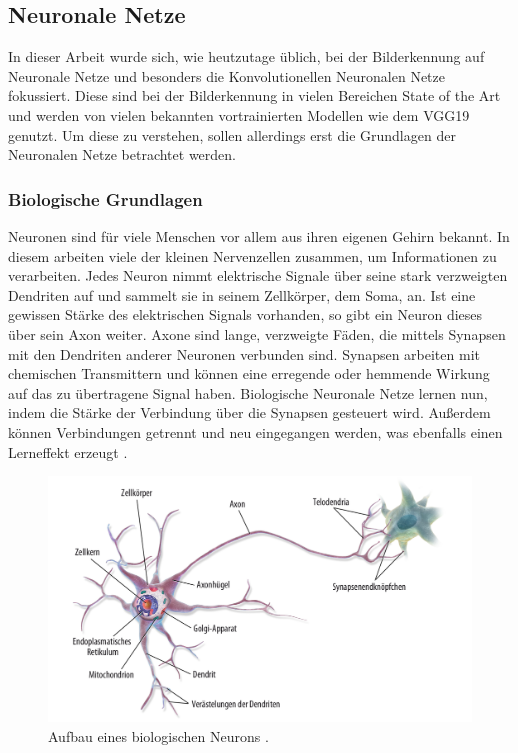 \documentclass[11pt,bibliography=totocnumbered]{scrartcl}
\begin{document}
\vspace*{-5mm}
\subsection{Neuronale Netze}
In dieser Arbeit wurde sich, wie heutzutage üblich, bei der Bilderkennung auf Neuronale Netze und besonders die Konvolutionellen Neuronalen Netze fokussiert. Diese sind bei der Bilderkennung in vielen Bereichen State of the Art und werden von vielen bekannten vortrainierten Modellen wie dem VGG19 genutzt. Um diese zu verstehen, sollen allerdings erst die Grundlagen der Neuronalen Netze betrachtet werden.
\subsubsection{Biologische Grundlagen}
Neuronen sind für viele Menschen vor allem aus ihren eigenen Gehirn bekannt. In diesem arbeiten viele der kleinen Nervenzellen zusammen, um Informationen zu verarbeiten. Jedes Neuron nimmt elektrische Signale über seine stark verzweigten Dendriten auf und sammelt sie in seinem Zellkörper, dem Soma, an. Ist eine gewissen Stärke des elektrischen Signals vorhanden, so gibt ein Neuron dieses über sein Axon weiter. Axone sind lange, verzweigte Fäden, die mittels Synapsen mit den Dendriten anderer Neuronen verbunden sind. Synapsen arbeiten mit chemischen Transmittern und können eine erregende oder hemmende Wirkung auf das zu übertragene Signal haben. Biologische Neuronale Netze lernen nun, indem die Stärke der Verbindung über die Synapsen gesteuert wird. Außerdem können Verbindungen getrennt und neu eingegangen werden, was ebenfalls einen Lerneffekt erzeugt \cite[S.24]{BA}\cite[S.43-45]{DEEP_LEARNING}\cite[S.29-30]{NNP}.
\begin{figure}[H]
	\centering
	\includegraphics[width=1\textwidth]{neuron_biologisch}
	\vspace*{-5mm}
	\caption[Aufbau eines biologischen Neurons]{Aufbau eines biologischen Neurons \cite[S.255]{MACHINE_LEARNING}.}
	\label{fig:aufbau_bio_neuron}
\end{figure}
\vspace*{-5mm}
\end{document}
